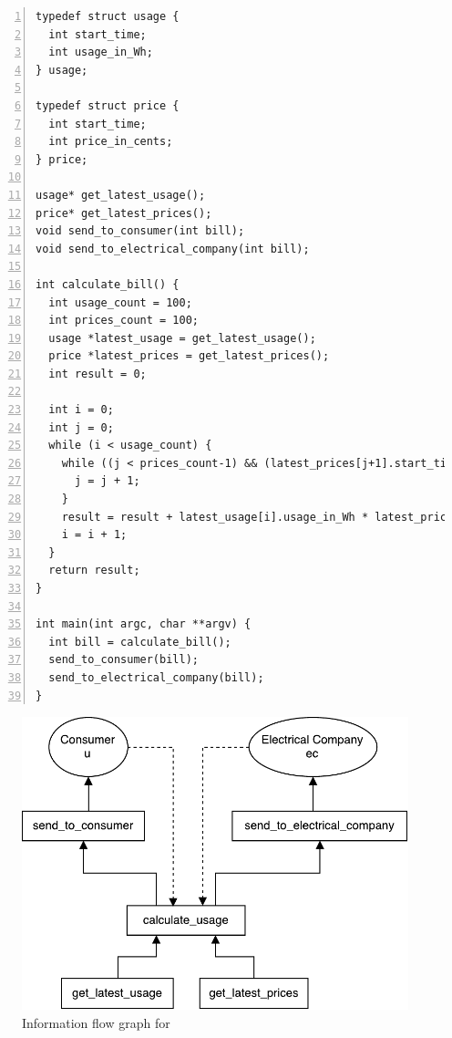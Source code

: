 \begin{lstlisting}[float, style=dlmc, numbers=left, caption={Smart meter bill calculation}, label=example:calculate_bill]
typedef struct usage {
  int start_time;
  int usage_in_Wh;
} usage;

typedef struct price {
  int start_time;
  int price_in_cents;
} price;

usage* get_latest_usage();
price* get_latest_prices();
void send_to_consumer(int bill);
void send_to_electrical_company(int bill);

int calculate_bill() {
  int usage_count = 100;
  int prices_count = 100;
  usage *latest_usage = get_latest_usage();
  price *latest_prices = get_latest_prices();
  int result = 0;

  int i = 0;
  int j = 0;
  while (i < usage_count) {
    while ((j < prices_count-1) && (latest_prices[j+1].start_time <= latest_usage[i].start_time)) {
      j = j + 1;
    }
    result = result + latest_usage[i].usage_in_Wh * latest_prices[j].price_in_cents;
    i = i + 1;
  }
  return result;
}

int main(int argc, char **argv) {
  int bill = calculate_bill();
  send_to_consumer(bill);
  send_to_electrical_company(bill);
}
\end{lstlisting}

\begin{figure}
  \centering
  \includegraphics[scale=0.8]{figures/dlm_calculate_bill}
  \caption{Information flow graph for }
  \label{example:graph:calculate_bill}
\end{figure}

